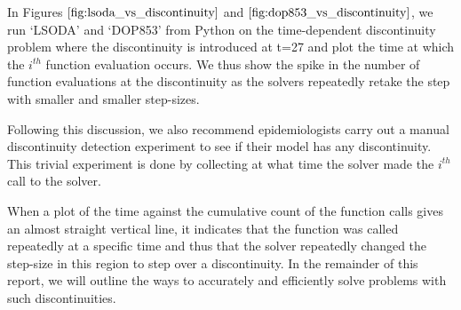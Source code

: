 In Figures $\ref{fig:lsoda_vs_discontinuity}$ and $\ref{fig:dop853_vs_discontinuity}$, we run `LSODA' and `DOP853' from Python on the time-dependent discontinuity problem where the discontinuity is introduced at t=27 and plot the time at which the $i^{th}$ function evaluation occurs. We thus show the spike in the number of function evaluations at the discontinuity as the solvers repeatedly retake the step with smaller and smaller step-sizes.

Following this discussion, we also recommend epidemiologists carry out a manual discontinuity detection experiment to see if their model has any discontinuity. This trivial experiment is done by collecting at what time the solver made the $i^{th}$ call to the solver. 

When a plot of the time against the cumulative count of the function calls gives an almost straight vertical line, it indicates that the function was called repeatedly at a specific time and thus that the solver repeatedly changed the step-size in this region to step over a discontinuity. In the remainder of this report, we will outline the ways to accurately and efficiently solve problems with such discontinuities.
